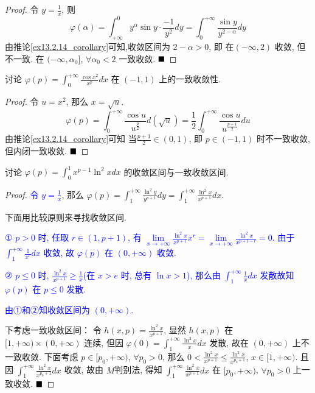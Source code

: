 \documentclass[lang=cn,newtx,10pt,scheme=chinese]{elegantbook}
\begin{document}
\begin{proof}
令 $y=\frac{1}{x}$, 则
$$ \varphi(\alpha) = \int_{+\infty}^{0} y^{\alpha} \sin y \cdot \frac{-1}{y^2} dy = \int_{0}^{+\infty} \frac{\sin y}{y^{2-\alpha}} dy $$
由推论\ref{ex13.2.14_corollary}可知,收敛区间为 $2-\alpha > 0$, 即 在$(-\infty, 2)$ 收敛, 但不一致. 在 $(-\infty, \alpha_0]$, $\forall \alpha_0 < 2$ 一致收敛.
$\hfill \blacksquare$
\end{proof}

\begin{example}
讨论 $\varphi(p) = \int_{0}^{+\infty} \frac{\cos x^2}{x^p} dx$ 在 $(-1, 1)$ 上的一致收敛性.
\end{example}

\begin{proof}
令 $u = x^2$, 那么 $x = \sqrt{u}$.
$$ \varphi(p) = \int_{0}^{+\infty} \frac{\cos u}{u^{\frac{p}{2}}} d(\sqrt{u}) = \frac{1}{2} \int_{0}^{+\infty} \frac{\cos u}{u^{\frac{p+1}{2}}} du $$
由推论\ref{ex13.2.14_corollary}可知 当$\frac{p+1}{2} \in (0, 1)$, 即 $p \in (-1, 1)$ 时不一致收敛, 但内闭一致收敛.
$\hfill \blacksquare$
\end{proof}

\begin{example}\label{ex13.2.17}
讨论 $\varphi(p) = \int_{0}^{1} x^{p-1} \ln^2 x dx$ 的收敛区间与一致收敛区间.
\end{example}

\begin{proof}
\textcolor{blue}{令 $y = \frac{1}{x}$}, 那么 $\varphi(p) = \int_{1}^{+\infty} \frac{\ln^2 y}{y^{p+1}} dy = \int_{1}^{+\infty} \frac{\ln^2 x}{x^{p+1}} dx$.

下面用比较原则来寻找收敛区间.

\textcolor{blue}{① $p > 0$ 时, 任取 $r \in (1, p+1)$, 有 $\lim\limits_{x \to +\infty} \frac{\ln^2 x}{x^{p+1}} x^r = \lim\limits_{x \to +\infty} \frac{\ln^2 x}{x^{p+1-r}} = 0$.
由于 $\int_{1}^{+\infty} \frac{1}{x^r} dx$ 收敛, 故 $\varphi(p)$ 在 $(0, +\infty)$ 收敛.}

\textcolor{blue}{② $p \le 0$ 时, $\frac{\ln^2 x}{x^{p+1}} \ge \frac{1}{x}$(在 $x > e$ 时, 总有 $\ln x > 1$), 那么由 $\int_{1}^{+\infty} \frac{1}{x} dx$ 发散故知 $\varphi(p)$ 在 $p \le 0$ 发散.}

\textcolor{blue}{由①和②知收敛区间为 $(0, +\infty)$.}

下考虑一致收敛区间：
令 $h(x, p) = \frac{\ln^2 x}{x^{p+1}}$, 显然 $h(x,p)$ 在 $[1, +\infty) \times (0, +\infty)$ 连续, 但因 $\varphi(0) = \int_1^{+\infty} \frac{\ln^2 x}{x} dx$ 发散, 故在 $(0, +\infty)$ 上不一致收敛. 下面考虑 $p \in [p_0, +\infty)$, $\forall p_0 > 0$, 那么 $0 < \frac{\ln^2 x}{x^{p+1}} \le \frac{\ln^2 x}{x^{p_0+1}}$, $x \in [1, +\infty)$.
且因 $\int_{1}^{+\infty} \frac{\ln^2 x}{x^{p_0+1}} dx$ 收敛,
故由 $M$判别法, 得知 $\int_{1}^{+\infty} \frac{\ln^2 x}{x^{p+1}} dx$ 在 $[p_0, +\infty)$, $\forall p_0 > 0$ 上一致收敛.
$\hfill \blacksquare$
\end{proof}
\end{document}
